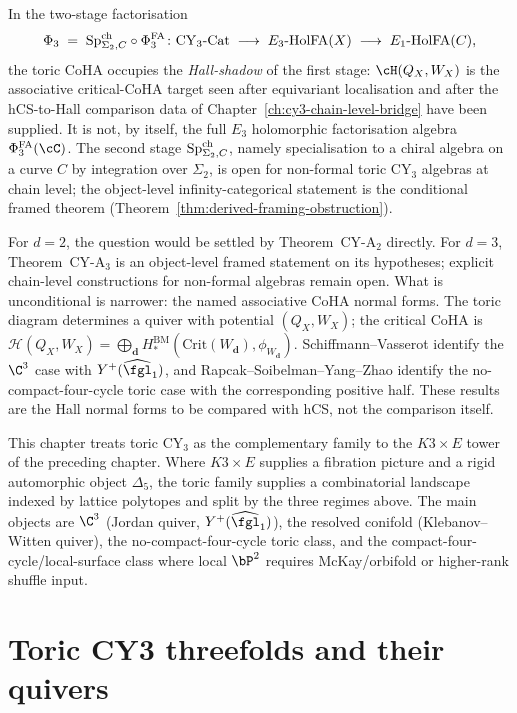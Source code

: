 In the two-stage factorisation
\[
 \Phi_3 \;=\; \mathrm{Sp}^{\mathrm{ch}}_{\Sigma_2, C} \circ \Phi^{\mathrm{FA}}_3
 \colon \mathrm{CY}_3\text{-}\mathrm{Cat}
 \;\longrightarrow\; E_3\text{-}\mathrm{HolFA}(X)
 \;\longrightarrow\; E_1\text{-}\mathrm{HolFA}(C),
\]
the toric CoHA occupies the \emph{Hall-shadow} of the first stage:
$\cH(Q_X, W_X)$ is the associative critical-CoHA target seen after
equivariant localisation and after the hCS-to-Hall comparison data of
Chapter~\ref{ch:cy3-chain-level-bridge} have been supplied. It is not, by
itself, the full $E_3$ holomorphic factorisation algebra
$\PhiFA_3(\cC)$. The second stage
$\mathrm{Sp}^{\mathrm{ch}}_{\Sigma_2, C}$, namely specialisation to a chiral algebra on a
curve $C$ by integration over $\Sigma_2$, is open for non-formal toric
CY$_3$ algebras at chain level; the object-level infinity-categorical
statement is the conditional framed theorem
(Theorem~\ref{thm:derived-framing-obstruction}).

For $d = 2$, the question would be settled by Theorem~CY-A$_2$ directly.
For $d = 3$, Theorem~CY-A$_3$ is an object-level framed statement on its
hypotheses; explicit chain-level constructions for non-formal algebras
remain open. What is unconditional is narrower: the named associative
CoHA normal forms. The toric diagram determines a quiver with potential
$(Q_X, W_X)$; the critical CoHA is
$\mathcal{H}(Q_X, W_X) =
\bigoplus_\mathbf{d}H^{\mathrm{BM}}_*(\mathrm{Crit}(W_\mathbf{d}),
\phi_{W_\mathbf{d}})$. Schiffmann--Vasserot identify the $\C^3$ case
with $Y^+(\widehat{\fgl}_1)$, and
Rapcak--Soibelman--Yang--Zhao identify the no-compact-four-cycle toric
case with the corresponding positive half. These results are the Hall
normal forms to be compared with hCS, not the comparison itself.

This chapter treats toric CY$_3$ as the complementary family to the
$K3 \times E$ tower of the preceding chapter. Where $K3 \times E$
supplies a fibration picture and a rigid automorphic object $\Delta_5$,
the toric family supplies a combinatorial landscape indexed by lattice
polytopes and split by the three regimes above. The main objects are
$\C^3$ (Jordan quiver, $Y^+(\widehat{\fgl}_1)$), the resolved conifold
(Klebanov--Witten quiver), the no-compact-four-cycle toric class, and
the compact-four-cycle/local-surface class where local $\bP^2$ requires
McKay/orbifold or higher-rank shuffle input.

\section{Toric CY3 threefolds and their quivers}
\label{sec:toric-cy3-quivers}

